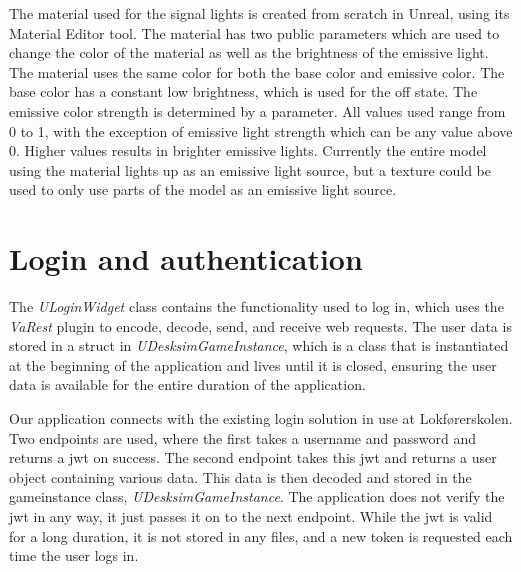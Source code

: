 The material used for the signal lights is created from scratch in Unreal, using its Material Editor tool. The material has two public parameters which are used to change the color of the material as well as the brightness of the \Gls{emissive light}. The material uses the same color for both the base color and emissive color. The base color has a constant low brightness, which is used for the off state. The emissive color strength is determined by a parameter. All values used range from 0 to 1, with the exception of emissive light strength which can be any value above 0. Higher values results in brighter emissive lights. Currently the entire model using the material lights up as an emissive light source, but a texture could be used to only use parts of the model as an emissive light source.


\section{Login and authentication}

The \textit{ULoginWidget} class contains the functionality used to log in, which uses the \textit{VaRest} plugin to encode, decode, send, and receive web requests. The user data is stored in a struct in \textit{UDesksimGameInstance}, which is a class that is instantiated at the beginning of the application and lives until it is closed, ensuring the user data is available for the entire duration of the application. 

Our application connects with the existing login solution in use at Lokførerskolen. Two endpoints are used, where the first takes a username and password and returns a \acrfull{jwt} on success. The second endpoint takes this \acrfull{jwt} and returns a user object containing various data. This data is then decoded and stored in the gameinstance class, \textit{UDesksimGameInstance}. The application does not verify the \acrfull{jwt} in any way, it just passes it on to the next endpoint. While the \acrfull{jwt} is valid for a long duration, it is not stored in any files, and a new token is requested each time the user logs in. 

